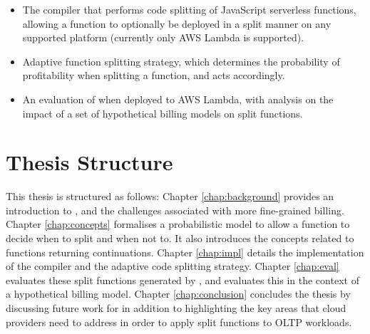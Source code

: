 \begin{itemize}
    \item The \faaasc{} compiler that performs code splitting of JavaScript serverless functions, allowing a function to optionally be deployed in a split manner on any supported \faas{} platform (currently only AWS Lambda is supported).

    \item Adaptive function splitting strategy, which determines the probability of profitability when splitting a function, and acts accordingly.

    \item An evaluation of \faaas{} when deployed to AWS Lambda, with analysis on the impact of a set of hypothetical billing models on split functions.
\end{itemize}

\section{Thesis Structure}
This thesis is structured as follows: Chapter \ref{chap:background} provides an introduction to \faas{}, and the challenges associated with more fine-grained billing. Chapter \ref{chap:concepts} formalises a probabilistic model to allow a function to decide when to split and when not to. It also introduces the concepts related to functions returning continuations. Chapter \ref{chap:impl} details the implementation of the \faaasc{} compiler and the adaptive code splitting strategy. Chapter \ref{chap:eval} evaluates these split functions generated by \faaasc{}, and evaluates this in the context of a hypothetical billing model. Chapter \ref{chap:conclusion} concludes the thesis by discussing future work for \faaas{} in addition to highlighting the key areas that cloud providers need to address in order to apply \faaas{} split functions to OLTP workloads.
